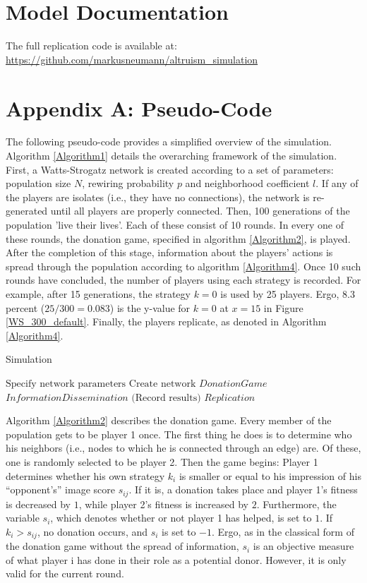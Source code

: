 \documentclass{JASSS}
\begin{document}
\section{Model Documentation}
The full replication code is available at: \url{https://github.com/markusneumann/altruism_simulation}

\section{Appendix A: Pseudo-Code}
\FloatBarrier
The following pseudo-code provides a simplified overview of the simulation. Algorithm \ref{Algorithm1} details the overarching framework of the simulation. First, a Watts-Strogatz network is created according to a set of parameters: population size $N$, rewiring probability $p$ and neighborhood coefficient $l$. If any of the players are isolates (i.e., they have no connections), the network is re-generated until all players are properly connected. Then, 100 generations of the population 'live their lives'. Each of these consist of 10 rounds. In every one of these rounds, the donation game, specified in algorithm \ref{Algorithm2}, is played. After the completion of this stage, information about the players' actions is spread through the population according to algorithm \ref{Algorithm4}. Once 10 such rounds have concluded, the number of players using each strategy is recorded. For example, after 15 generations, the strategy $k=0$ is used by 25 players. Ergo, 8.3 percent ($25/300=0.083$) is the y-value for $k=0$ at $x=15$ in Figure \ref{WS_300_default}. Finally, the players replicate, as denoted in Algorithm \ref{Algorithm4}.

\begin{algorithm}
	\caption{Simulation}
	\label{Algorithm1}
	\begin{algorithmic}[1]
		\State $\text{Specify network parameters}$
		\State $\text{Create network}$
		\State $DonationGame$
		\State $InformationDissemination$
		\EndFor
		\State $\text{(Record results)}$
		\State $Replication$
		\EndFor
		\EndFunction
	\end{algorithmic}
\end{algorithm}

Algorithm \ref{Algorithm2} describes the donation game. Every member of the population gets to be player 1 once. The first thing he does is to determine who his neighbors (i.e., nodes to which he is connected through an edge) are. Of these, one is randomly selected to be player 2. Then the game begins: Player 1 determines whether his own strategy $k_i$ is smaller or equal to his impression of his ``opponent's'' image score $s_{ij}$. If it is, a donation takes place and player 1's fitness is decreased by $1$, while player 2's fitness is increased by $2$. Furthermore, the variable $s_i$, which denotes whether or not player 1 has helped, is set to $1$. If $k_i>s_{ij}$, no donation occurs, and $s_i$ is set to $-1$. Ergo, as in the classical form of the donation game without the spread of information, $s_i$ is an objective measure of what player i has done in their role as a potential donor. However, it is only valid for the current round.
\end{document}
